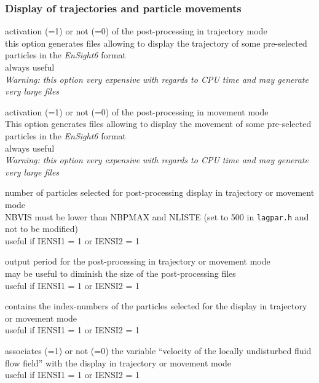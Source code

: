 \subsubsection{Display of trajectories and particle movements}

{activation (=1) or not (=0) of the post-processing in trajectory mode\\
this option generates files allowing to display the trajectory of
some pre-selected particles in the \textit{EnSight6} format\\
always useful\\
{\em Warning: this option very expensive with regards to CPU time and may
generate very large files}}

{activation (=1) or not (=0) of the post-processing in movement
mode\\
This option generates files allowing to display the movement of
some pre-selected particles in the \textit{EnSight6} format\\
always useful\\
{\em Warning: this option very expensive with regards to CPU time and may
generate very large files}}

{number of particles selected for post-processing display in trajectory or
movement mode\\
NBVIS must be lower than NBPMAX and NLISTE (set to 500 in \texttt{lagpar.h} and
not to be modified)\\
useful if IENSI1 = 1 or IENSI2 = 1}

{output period for the post-processing in trajectory or
movement mode\\
may be useful to diminish the size of the post-processing files\\
useful if IENSI1 = 1 or IENSI2 = 1}

{contains the index-numbers of the particles selected for the display in
trajectory or movement mode\\
useful if IENSI1 = 1 or IENSI2 = 1}

{associates (=1) or not (=0) the variable ``velocity of the locally
undisturbed fluid flow field'' with the display in trajectory or
movement mode\\
useful if IENSI1 = 1 or IENSI2 = 1}

